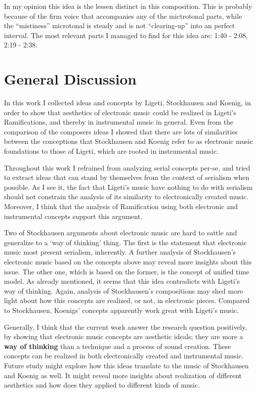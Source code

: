 \documentclass[a4paper,11pt]{article}
\begin{document}
In my opinion this idea is the lessen distinct in this composition.
This is probably because of the firm voice that accompanies any of the mictrotonal parts, while the ``mistiness'' microtonal is steady and is not ``clearing-up'' into an perfect interval.
The most relevant parts I managed to find for this idea are: 1:40 - 2:08, 2:19 - 2:38.

\section{General Discussion}
\label{sec:general_discussion}

In this work I collected ideas and concepts by Ligeti, Stockhausen and Koenig, in order to show that aesthetics of electronic music could be realized in Ligeti's Ramifications, and thereby in instrumental music in general.
Even from the comparison of the composers ideas I showed that there are lots of similarities between the conceptions that Stockhausen and Koenig refer to as electronic music foundations to those of Ligeti, which are rooted in instrumental music.

Throughout this work I refrained from analyzing serial concepts per-se, and tried to extract ideas that can stand by themselves from the context of serialism when possible.
As I see it, the fact that Ligeti's music have nothing to do with serialism should not constrain the analysis of its similarity to electronically created music.
Moreover, I think that the analysis of Ramification using both electronic and instrumental concepts support this argument.

Two of Stockhausen arguments about electronic music are hard to sattle and generalize to a `way of thinking' thing.
The first is the statement that electronic music most present serialism, inherently.
A further analysis of Stockhausen's electronic music based on the concepts above may reveal more insights about this issue.
The other one, which is based on the former, is the concept of unified time model.
As already mentioned, it seems that this idea contradicts with Ligeti's way of thinking.
Again, analysis of Stockhausen's compositions may shed more light about how this concepts are realized, or not, in electronic pieces.
Compared to Stockhausen, Koenigs' concepts apparently work great with Ligeti's music.

Generally, I think that the current work answer the research question positively, by showing that electronic music concepts are aesthetic ideals; they are more a \textbf{way of thinking} than a technique and a process of sound creation.
These concepts can be realized in both electronically created and instrumental music.
Future study might explore how this ideas translate to the music of Stockhausen and Koenig as well.
It might reveal more insights about realization of different aesthetics and how does they applied to different kinds of music.

\printbibliography[title={Bibliography}]
\end{document}
